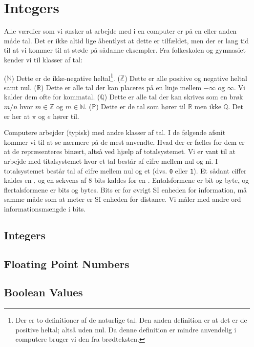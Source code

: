 \chapter{Integers}
\label{sec:int}

Alle værdier som vi ønsker at arbejde med i en computer er på en eller anden måde tal. Det er ikke altid lige åbentlyst at dette er tilfældet, men der er lang tid til at vi kommer til at støde på sådanne eksempler. Fra folkeskolen og gymnasiet kender vi til klasser af tal:
\begin{itemize}
   ($\mathbb{N}$) Dette er de ikke-negative heltal\footnote{Der er to definitioner af de naturlige tal. Den anden definition er at det er de positive heltal; altså uden nul. Da denne definition er mindre anvendelig i computere bruger vi den fra brødteksten.}.
   ($\mathbb{Z}$) Dette er alle positive og negative heltal samt nul.
   ($\mathbb{R}$) Dette er alle tal der kan placeres på en linje mellem $-\infty$ og $\infty$. Vi kalder dem ofte for kommatal.
   ($\mathbb{Q}$) Dette er alle tal der kan skrives som en brøk $m/n$ hvor $m \in \mathbb{Z}$ og $m \in \mathbb{N}$.
   ($\mathbb{P}$) Dette er de tal som hører til $\mathbb{R}$ men ikke $\mathbb{Q}$. Det er her at $\pi$ og $e$ hører til.
\end{itemize}
Computere arbejder (typisk) med andre klasser af tal. I de følgende afsnit kommer vi til at se nærmere på de mest anvendte. Hvad der er fælles for dem er at de repræsenteres binært, altså ved hjælp af totalsystemet. Vi er vant til at arbejde med titalsystemet hvor et tal består af cifre mellem nul og ni. I totalsystemet består tal af cifre mellem nul og et (dvs. \texttt{0} eller \texttt{1}). Et sådant ciffer kaldes en , og en sekvens af 8 bits kaldes for en . Entalsformene er bit og byte, og flertalsformene er bits og bytes. Bits er for øvrigt SI enheden for information, må samme måde som at meter er SI enheden for distance. Vi måler med andre ord informationsmængde i bits.

\section{Integers}



\section{Floating Point Numbers}


\section{Boolean Values}

